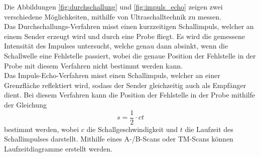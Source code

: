     Die Abbildungen \ref{fig:durchschallung} und \ref{fig:impuls_echo} zeigen zwei verschiedene Möglichkeiten,
    mithilfe von Ultraschalltechnik zu messen.\\
    Das Durchschallungs-Verfahren misst einen kurzzeitigen Schallimpuls,
    welcher an einem Sender erzeugt wird und durch eine Probe fliegt.
    Es wird die gemessene Intensität des Impulses untersucht,
    welche genau dann absinkt, 
    wenn die Schallwelle eine Fehlstelle passiert,
    wobei die genaue Position der Fehlstelle in der Probe mit diesem Verfahren nicht bestimmt werden kann.\\
    Das Impuls-Echo-Verfahren misst einen Schallimpuls,
    welcher an einer Grenzfläche reflektiert wird,
    sodass der Sender gleichzeitig auch als Empfänger dient.
    Bei diesem Verfahren kann die Position der Fehlstelle in der Probe mithilfe der Gleichung
    \begin{equation}
        s = \frac{1}{2} \cdot c t
        \label{eqn:position_fehlstelle}
    \end{equation}
    bestimmt werden,
    wobei $c$ die Schallgeschwindigkeit und $t$ die Laufzeit des Schallimpulses darstellt.
    Mithilfe eines A-/B-Scans oder TM-Scans können Laufzeitdiagramme erstellt werden.

